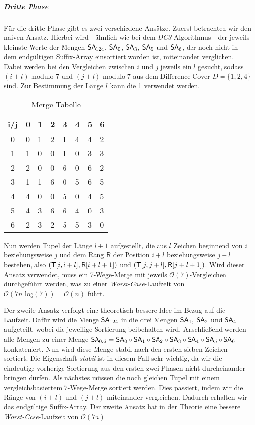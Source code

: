 \subparagraph*{Dritte Phase}

Für die dritte Phase gibt es zwei verschiedene Ansätze. Zuerst betrachten wir den naiven Ansatz. Hierbei wird - ähnlich wie bei dem \emph{DC3}-Algorithmus - der jeweils kleinste Werte der Mengen $\sa_{124}$, $\sa_0$, $\sa_3$, $\sa_5$ und  $\sa_6$, der noch nicht in dem endgültigen Suffix-Array einsortiert worden ist, miteinander verglichen. Dabei werden bei den Vergleichen zwischen $i$ und $j$ jeweils ein $l$ gesucht, sodass $(i + l) \text{ modulo } 7$ und $(j + l) \text{ modulo } 7$ aus dem Difference Cover $D = \{1, 2, 4\}$ sind. Zur Bestimmung der Länge $l$ kann die \cref{tab:merge} verwendet werden.

\begin{table}[H]
	\centering
	\begin{tabular}{c|lllllll}
		i/j & 0 & 1 & 2 & 3 & 4 & 5 & 6 \\\hline
		0   & 0 & 1 & 2 & 1 & 4 & 4 & 2 \\
		1   & 1 & 0 & 0 & 1 & 0 & 3 & 3 \\
		2   & 2 & 0 & 0 & 6 & 0 & 6 & 2 \\
		3   & 1 & 1 & 6 & 0 & 5 & 6 & 5 \\
		4   & 4 & 0 & 0 & 5 & 0 & 4 & 5 \\
		5   & 4 & 3 & 6 & 6 & 4 & 0 & 3 \\
		6   & 2 & 3 & 2 & 5 & 5 & 3 & 0
	\end{tabular}
	\caption{Merge-Tabelle}
	\label{tab:merge}
\end{table}

Nun werden Tupel der Länge $l+1$ aufgestellt, die aus $l$ Zeichen beginnend von $i$ beziehungsweise $j$ und dem Rang $\mathsf{R}$ der Position $i+l$ beziehungsweise $j+l$ bestehen, also $(\inputtext[i, i+l], \mathsf{R}[i+l+1])$ und $(\inputtext[j, j+l], \mathsf{R}[j+l+1])$. Wird dieser Ansatz verwendet, muss ein 7-Wege-Merge mit jeweils $\mathcal{O}(7)$-Vergleichen durchgeführt werden, was zu einer \emph{Worst-Case}-Laufzeit von $\mathcal{O}(7n \text{ log} (7)) = \mathcal{O}(n) $ führt.

Der zweite Ansatz verfolgt eine theoretisch bessere Idee im Bezug auf die Laufzeit. Dafür wird die Menge $\sa_{124}$ in die drei Mengen $\sa_1$, $\sa_2$ und $\sa_4$ aufgeteilt, wobei die jeweilige Sortierung beibehalten wird. Anschließend werden alle Mengen zu einer Menge $\sa_{0:6} = \sa_0 \circ \sa_1 \circ \sa_2 \circ \sa_3 \circ \sa_4 \circ \sa_5 \circ \sa_6$ konkateniert. Nun wird diese Menge stabil nach den ersten sieben Zeichen sortiert. Die Eigenschaft \emph{stabil} ist in diesem Fall sehr wichtig, da wir die eindeutige vorherige Sortierung aus den ersten zwei Phasen nicht durcheinander bringen dürfen. Als nächstes müssen die noch gleichen Tupel mit einem vergleichsbasiertem $7$-Wege-Merge sortiert werden. Dies passiert, indem wir die Ränge von $(i+l)$ und $(j+l)$ miteinander vergleichen. Dadurch erhalten wir das endgültige Suffix-Array. Der zweite Ansatz hat in der Theorie eine bessere \emph{Worst-Case}-Laufzeit von $\mathcal{O}(7n)$

